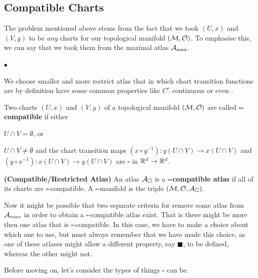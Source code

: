 \documentclass[12pt]{article} %
\newcommand{\bfs}[1]{\textbf{({#1}) }}
\begin{document}
\subsection{Compatible Charts}
The problem mentioned above stems from the fact that we took $(U,x)$ and $(V,y)$ to be \textit{any} charts for our topological manifold $(\mathcal{M},\mathcal{O})$. To emphasise this, we can say that we took them from the maximal atlas $\mathcal{A}_{\max}$. 

$\bullet$  

We choose smaller and more restrict atlas that in which chart transition functions are by definition have some common properties like $C^r$ continuous or even . 

    Two charts $(U,x)$ and $(V,y)$ of a topological manifold $(\mathcal{M},\mathcal{O})$ are called \textbf{$\square$-compatible} if either
    \ben[label=(\alph*)] 
        \item $U\cap V =\emptyset$, or 
        \item $U\cap V \neq \emptyset$ and the chart transition maps $(x\circ y^{-1}):y(U\cap V) \to x(U\cap V)$ and $(y\circ x^{-1}):x(U\cap V) \to y(U\cap V)$ are  $\square$ in $\mathbb{R}^d\to \mathbb{R}^d$.
    \een 
\ed 

\bd\bfs{Compatible/Restricted Atlas}
    An atlas $\mathcal{A}_{\square}$ is a \textbf{$\square$-compatible atlas} if all of its charts are $\square$-compatible.   A $\square$-manifold is the triple $(\mathcal{M},\mathcal{O},\mathcal{A}_{\square})$.
\ed 
\begin{rema}
Now it might be possible that two separate criteria for remove some atlas from  $\mathcal{A}_{max}$  in order to obtain a $\square$-compatible atlas exist. That is there might be more then one atlas that is $\square$-compatible. In this case, we have to make a choice about which one to use, but must always remember that we have made this choice, as one of these atlases might allow a different property, say $\blacksquare$, to be defined, whereas the other might not. 
\end{rema}


Before moving on, let's consider the types of things $\square$ can be. 
\end{document}
